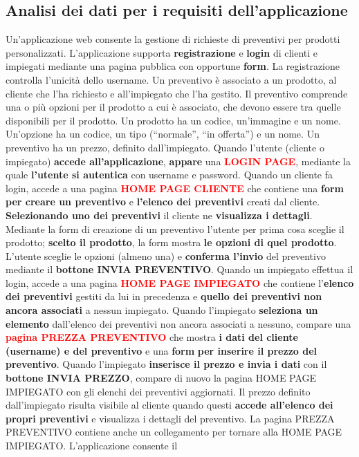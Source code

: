 \documentclass[a4paper, 12pt]{article}
\begin{document}
\subsection{Analisi dei dati per i requisiti dell'applicazione}
Un’applicazione web consente la gestione di richieste di preventivi per prodotti personalizzati. L’applicazione supporta \textbf{\textcolor{myBrown}{registrazione}} e \textbf{\textcolor{myBrown}{login}} di clienti e impiegati mediante una pagina pubblica con opportune \textbf{\textcolor{myGreen}{form}}. La registrazione controlla l’unicità dello username. Un preventivo è associato a un prodotto, al cliente che l’ha richiesto e all’impiegato che l’ha gestito. Il preventivo comprende una o più opzioni per il prodotto a cui è associato, che devono essere tra quelle disponibili per il prodotto. Un prodotto ha un codice, un’immagine e un nome. Un’opzione ha un codice, un tipo (“normale”, “in offerta”) e un nome. Un preventivo ha un prezzo, definito dall’impiegato. Quando l’utente (cliente o impiegato) \textbf{\textcolor{myBlue}{accede all’applicazione}}, \textbf{\textcolor{myBrown}{appare}} una \textbf{\textcolor{red}{LOGIN PAGE}}, mediante la quale \textbf{\textcolor{myBlue}{l’utente si autentica}} con username e password. Quando un cliente fa login, accede a una pagina \textbf{\textcolor{red}{HOME PAGE CLIENTE}} che contiene una \textbf{\textcolor{myGreen}{form}} \textbf{\textcolor{myBrown}{per creare un preventivo}} e \textbf{\textcolor{myGreen}{l’elenco dei preventivi}} creati dal cliente. \textbf{\textcolor{myBlue}{Selezionando uno dei preventivi}} il cliente ne \textbf{\textcolor{myGreen}{visualizza i dettagli}}. Mediante la form di creazione di un preventivo l’utente per prima cosa sceglie il prodotto; \textbf{\textcolor{myBlue}{scelto il prodotto}}, la form mostra \textbf{\textcolor{myGreen}{le opzioni di quel prodotto}}. L’utente sceglie le opzioni (almeno una) e \textbf{\textcolor{myBlue}{conferma l’invio}} del preventivo mediante il \textbf{\textcolor{myGreen}{bottone INVIA PREVENTIVO}}. Quando un impiegato effettua il login, accede a una pagina \textbf{\textcolor{red}{HOME PAGE IMPIEGATO}} che contiene l’\textbf{\textcolor{myGreen}{elenco dei preventivi}} gestiti da lui in precedenza e \textbf{\textcolor{myGreen}{quello dei preventivi non ancora associati}} a nessun impiegato. Quando l’impiegato \textbf{\textcolor{myBlue}{seleziona un elemento}} dall’elenco dei preventivi non ancora associati a nessuno, compare una \textbf{\textcolor{red}{pagina PREZZA PREVENTIVO}} che mostra \textbf{\textcolor{myGreen}{i dati del cliente (username) e del preventivo}} e una \textbf{\textcolor{myGreen}{form}} \textbf{\textcolor{myBrown}{per inserire il prezzo del preventivo}}. Quando l’impiegato \textbf{\textcolor{myBlue}{inserisce il prezzo e invia i dati}} con il \textbf{\textcolor{myGreen}{bottone INVIA PREZZO}}, compare di nuovo la pagina HOME PAGE IMPIEGATO con gli elenchi dei preventivi aggiornati. Il prezzo definito dall’impiegato risulta visibile al cliente quando questi \textbf{\textcolor{myBlue}{accede all’elenco dei propri preventivi}} e visualizza i dettagli del preventivo. La pagina PREZZA PREVENTIVO contiene anche un collegamento per tornare alla HOME PAGE IMPIEGATO. L’applicazione consente il 
\end{document}
